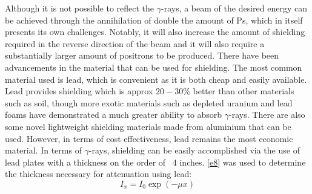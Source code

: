 Although it is not possible to reflect the $\gamma$-rays, a beam of the desired energy can be achieved through the annihilation of double the amount of Ps, which in itself presents its own challenges. Notably, it will also increase the amount of shielding required in the reverse direction of the beam and it will also require a substantially larger amount of positrons to be produced. There have been advancements in the material that can be used for shielding. The most common material used is lead, which is convenient as it is both cheap and easily available. Lead provides shielding which is approx $20-30\%$ better than other materials such as soil, though more exotic materials such as depleted uranium and lead foams have demonstrated a much greater ability to absorb $\gamma$-rays. There are also some novel lightweight shielding materials made from aluminium that can be used. However, in terms of cost effectiveness, lead remains the most economic material. 
\newline
\newline
In terms of $\gamma$-rays, shielding can be easily accomplished via the use of lead plates with a thickness on the order of ~4 inches. \ref{e8} was used to determine the thickness necessary for attenuation using lead:
\begin{equation}
\label{e8}
I_x = I_0 \exp(-\mu x)
\end{equation}
